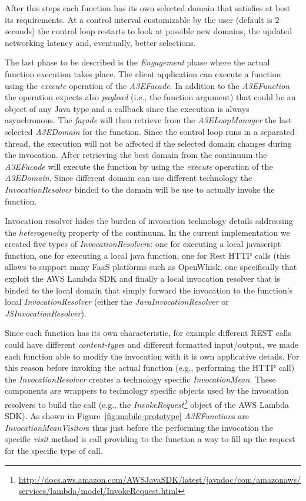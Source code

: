 After this steps each function has its own selected domain that satisfies at best its requirements. At a control interval customizable by the user (default is $2$ seconds) the control loop restarts to look at possible new domains, the updated networking latency and, eventually, better selections.

The last phase to be described is the \textit{Engagement} phase where the actual function execution takes place. The client application can execute a function using the \textit{execute} operation of the  \textit{A3EFacade}. In addition to the \textit{A3EFunction} the operation expects also \textit{payload} (i.e., the function argument) that could be an object of any Java type and a callback since the execution is always asynchronous. The \textit{fa\c{c}ade} will then retrieve from the \textit{A3ELoopManager} the last selected \textit{A3EDomain} for the function. Since the control loop runs in a separated thread, the execution will not be affected if the selected domain changes during the invocation. After retrieving the best domain from the continuum the \textit{A3EFacade} will execute the function by using the \textit{execute} operation of the \textit{A3EDomain}. Since different domain can use different technology the \textit{InvocationResolver} binded to the domain will be use to actually invoke the function. 

Invocation resolver hides the burden of invocation technology details addressing the \textit{heterogeneity} property of the continuum. In the current implementation we created five types of \textit{InvocationResolver}s: one for executing a local javascript function, one for executing a local java function, one for Rest HTTP calls (this allows to support many FaaS platforms such as OpenWhisk, one specifically that exploit the AWS Lambda SDK and finally a local invocation resolver that is binded to the local domain that simply forward the invocation to the function's local \textit{InvocationResolver} (either the \textit{JavaInvocationResolver} or \textit{JSInvocationResolver}). 

Since each function has its own characteristic, for example different REST calls could have different \textit{content-type}s and different formatted input/output, we made each function able to modify the invocation with it is own applicative details. For this reason before invoking the actual function (e.g., performing the HTTP call) the \textit{InvocationResolver} creates a technology specific \textit{InvocationMean}. These components are wrappers to technology specific objects used by the invocation resolvers to build the call (e.g., the \textit{InvokeRequest\footnote{\url{http://docs.aws.amazon.com/AWSJavaSDK/latest/javadoc/com/amazonaws/services/lambda/model/InvokeRequest.html}}} object of the AWS Lambda SDK). As shown in Figure~\ref{fig:mobile-prototype} \textit{A3EFunction}s are \textit{InvocationMeanVisitor}s thus just before the performing the invocation the specific \textit{visit} method is call providing to the function a way to fill up the request for the specific type of call. 

